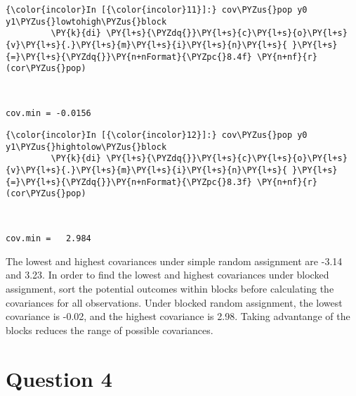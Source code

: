 \documentclass[11pt,notitlepage]{article}\usepackage[]{graphicx}\usepackage[]{color}
\makeatletter
\newenvironment{kframe}{%
 \def\at@end@of@kframe{}%
 \ifinner\ifhmode%
  \def\at@end@of@kframe{\end{minipage}}%
  \begin{minipage}{\columnwidth}%
 \fi\fi%
 \def\FrameCommand##1{\hskip\@totalleftmargin \hskip-\fboxsep
 \colorbox{shadecolor}{##1}\hskip-\fboxsep
     \hskip-\linewidth \hskip-\@totalleftmargin \hskip\columnwidth}%
 \MakeFramed {\advance\hsize-\width
   \@totalleftmargin\z@ \linewidth\hsize
   \@setminipage}}%
 {\par\unskip\endMakeFramed%
 \at@end@of@kframe}
\newenvironment{knitrout}{}{} %
\makeatother
\begin{document}
\begin{knitrout}
\begin{kframe}
    \begin{Verbatim}[commandchars=\\\{\}]
{\color{incolor}In [{\color{incolor}11}]:} cov\PYZus{}pop y0 y1\PYZus{}lowtohigh\PYZus{}block
         \PY{k}{di} \PY{l+s}{\PYZdq{}}\PY{l+s}{c}\PY{l+s}{o}\PY{l+s}{v}\PY{l+s}{.}\PY{l+s}{m}\PY{l+s}{i}\PY{l+s}{n}\PY{l+s}{ }\PY{l+s}{=}\PY{l+s}{\PYZdq{}}\PY{n+nFormat}{\PYZpc{}8.4f} \PY{n+nf}{r}(cor\PYZus{}pop)
\end{Verbatim}

    \begin{Verbatim}[commandchars=\\\{\}]


cov.min = -0.0156

    \end{Verbatim}

    \begin{Verbatim}[commandchars=\\\{\}]
{\color{incolor}In [{\color{incolor}12}]:} cov\PYZus{}pop y0 y1\PYZus{}hightolow\PYZus{}block
         \PY{k}{di} \PY{l+s}{\PYZdq{}}\PY{l+s}{c}\PY{l+s}{o}\PY{l+s}{v}\PY{l+s}{.}\PY{l+s}{m}\PY{l+s}{i}\PY{l+s}{n}\PY{l+s}{ }\PY{l+s}{=}\PY{l+s}{\PYZdq{}}\PY{n+nFormat}{\PYZpc{}8.3f} \PY{n+nf}{r}(cor\PYZus{}pop)
\end{Verbatim}

    \begin{Verbatim}[commandchars=\\\{\}]


cov.min =   2.984

    \end{Verbatim}
\end{kframe}
\end{knitrout}

The lowest and highest covariances under simple random assignment are -3.14 and 3.23.  In order to find the lowest and highest covariances under blocked assignment, sort the potential outcomes within blocks before calculating the covariances for all observations.  Under blocked random assignment, the lowest covariance is -0.02, and the highest covariance is 2.98. Taking advantange of the blocks reduces the range of possible covariances.


\section*{Question 4}
\begin{knitrout}
\color{fgcolor}\begin{kframe}
\begin{verbatim}






\end{verbatim}
\end{kframe}
\end{knitrout}
\end{document}
